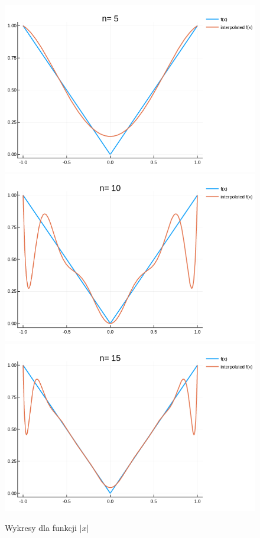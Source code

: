 \documentclass[12pt, a4paper]{article}
\begin{document}
\begin{figure}[h]
    \centering
    \includegraphics[scale=0.35]{../plots/ex6/1.png}
    \includegraphics[scale=0.35]{../plots/ex6/2.png}
    \includegraphics[scale=0.35]{../plots/ex6/3.png}    
    \caption{Wykresy dla funkcji $|x|$}
\end{figure}
\end{document}
